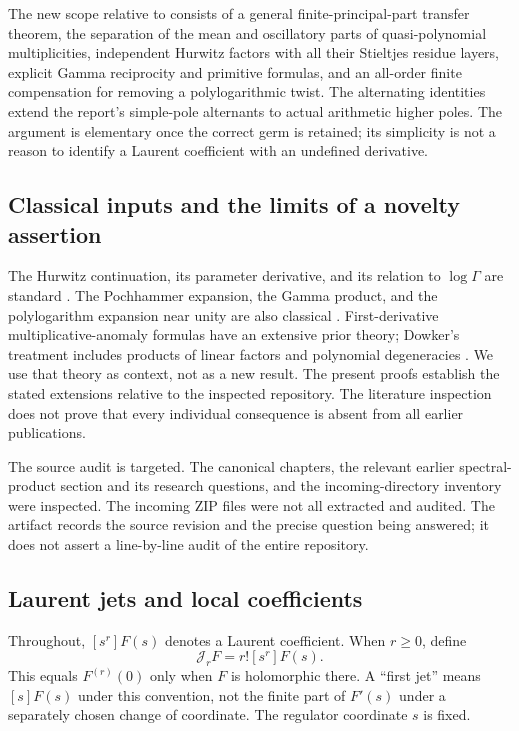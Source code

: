 \documentclass[11pt]{article}
\numberwithin{equation}{section}
\theoremstyle{definition}\newtheorem{definition}[theorem]{Definition}
\theoremstyle{remark}\newtheorem{remark}[theorem]{Remark}\newtheorem{example}[theorem]{Example}
\newcommand{\calJ}{\mathcal J}\newcommand{\calZ}{\mathcal Z}
\begin{document}
The new scope relative to \cite{prior} consists of a general finite-principal-part
transfer theorem, the separation of the mean and oscillatory parts of
quasi-polynomial multiplicities, independent Hurwitz factors with all their
Stieltjes residue layers, explicit Gamma reciprocity and primitive formulas, and
an all-order finite compensation for removing a polylogarithmic twist. The
alternating identities extend the report's simple-pole alternants to actual
arithmetic higher poles. The argument is elementary once the correct germ is
retained; its simplicity is not a reason to identify a Laurent coefficient with
an undefined derivative.

\subsection{Classical inputs and the limits of a novelty assertion}
The Hurwitz continuation, its parameter derivative, and its relation to
$\log\Gamma$ are standard \cite{dlmf-hurwitz}. The Pochhammer expansion, the
Gamma product, and the polylogarithm expansion near unity are also classical
\cite{dlmf-gamma,dlmf-polylog}. First-derivative multiplicative-anomaly formulas
have an extensive prior theory; Dowker's treatment includes products of linear
factors and polynomial degeneracies \cite{dowker}. We use that theory as context,
not as a new result. The present proofs establish the stated extensions relative
to the inspected repository. The literature inspection does not prove that every
individual consequence is absent from all earlier publications.

The source audit is targeted. The canonical chapters, the relevant earlier
spectral-product section and its research questions, and the incoming-directory
inventory were inspected. The incoming ZIP files were not all extracted and
audited. The artifact records the source revision and the precise question being
answered; it does not assert a line-by-line audit of the entire repository.

\subsection{Laurent jets and local coefficients}
Throughout, $[s^r]F(s)$ denotes a Laurent coefficient. When $r\ge0$, define
\begin{equation}\label{asj:eq:jetdef}
 \calJ_r F=r![s^r]F(s).
\end{equation}
This equals $F^{(r)}(0)$ only when $F$ is holomorphic there. A ``first jet''
means $[s]F(s)$ under this convention, not the finite part of $F'(s)$ under a
separately chosen change of coordinate. The regulator coordinate $s$ is fixed.
\end{document}
